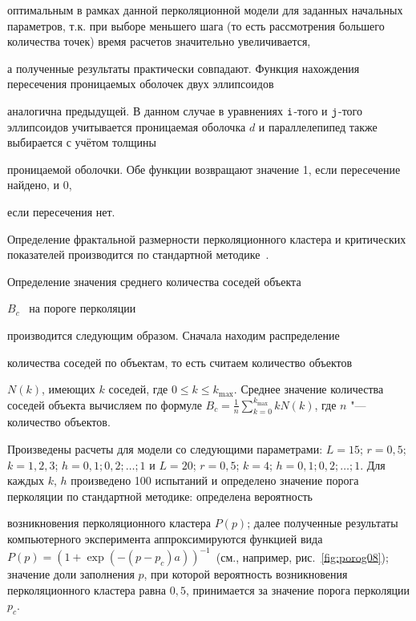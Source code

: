 оптимальным в рамках данной перколяционной модели для заданных начальных параметров, т.к. при выборе меньшего шага (то есть рассмотрения большего количества точек) время расчетов значительно увеличивается,

а полученные результаты практически совпадают. Функция нахождения пересечения проницаемых оболочек двух эллипсоидов

аналогична предыдущей. В данном случае в уравнениях $\tt i$-того и $\tt j$-того эллипсоидов учитывается проницаемая оболочка $d$ и параллелепипед также выбирается с учётом толщины

проницаемой оболочки. Обе функции возвращают значение 1, если пересечение найдено, и 0,

если пересечения нет.







Определение фрактальной размерности перколяционного кластера и критических показателей производится по стандартной методике~\cite{Tarasevich2002}.



Определение значения среднего количества соседей объекта

${B_c}$~\cite{Balberg} на пороге перколяции

производится следующим образом. Сначала находим распределение

количества соседей по объектам, то есть считаем количество объектов

$N(k)$, имеющих $k$ соседей, где $0\leqslant k\leqslant k_{\max}$. Среднее значение количества соседей объекта вычисляем по формуле $B_c=\frac1n{\sum_{k=0}^{k_{\max}}k N(k)}$, где $n$ "---  количество объектов.



\smallskip




Произведены расчеты для модели со следующими параметрами: $L=15$; $r=0,5$; $k=1, 2, 3$; $h=0,1; 0,2; \dots; 1$ и $L=20$; $r=0,5$; $k=4$; $h=0,1; 0,2; \dots; 1$. Для каждых $k$, $h$ произведено 100 испытаний и определено значение порога перколяции по стандартной методике: определена вероятность

возникновения перколяционного кластера $P(p)$; далее полученные результаты компьютерного эксперимента аппроксимируются функцией вида $P(p)=(1+\exp(-(p-p_{c})a))^{-1}$~(см., например, рис.~\ref{fig:porog08}); значение доли заполнения $p$, при которой вероятность возникновения перколяционного кластера равна $0,5$, принимается за значение порога перколяции $p_c$. 

